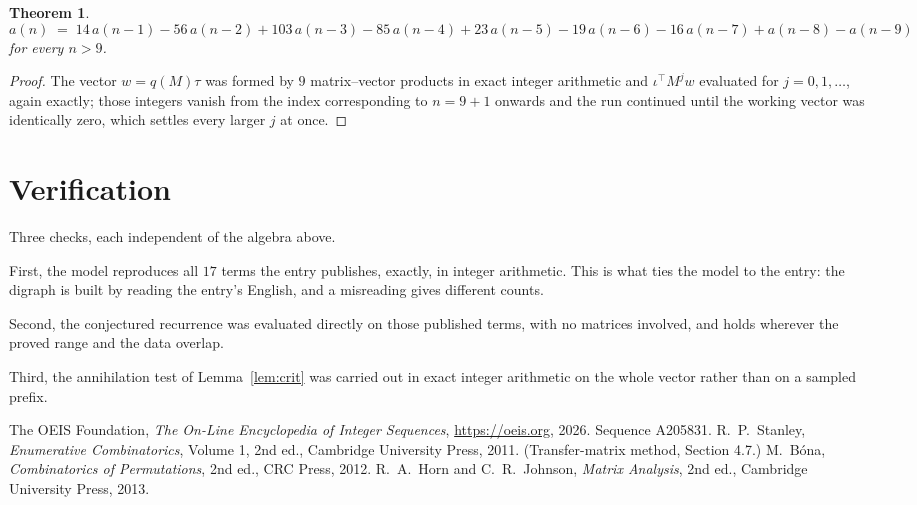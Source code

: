 \documentclass[11pt,a4paper]{article}
\theoremstyle{plain}
\newtheorem{theorem}{Theorem}
\theoremstyle{definition}
\begin{document}
\begin{theorem}
\[
a(n)\;=\;14\,a(n-1) - 56\,a(n-2) + 103\,a(n-3) - 85\,a(n-4) + 23\,a(n-5) - 19\,a(n-6) - 16\,a(n-7) + a(n-8) - a(n-9)
\]
for every $n>9$.
\end{theorem}

\begin{proof}
The vector $w=q(M)\tau$ was formed by $9$ matrix--vector products in exact integer
arithmetic and $\iota^{\!\top}M^{j}w$ evaluated for $j=0,1,\dots$, again exactly; those
integers vanish from the index corresponding to $n=9+1$ onwards and the run continued
until the working vector was identically zero, which settles every larger $j$ at once.
\end{proof}

\section{Verification}

Three checks, each independent of the algebra above.

First, the model reproduces all $17$ terms the entry publishes, exactly, in integer
arithmetic. This is what ties the model to the entry: the digraph is built by reading the
entry's English, and a misreading gives different counts.

Second, the conjectured recurrence was evaluated directly on those published terms, with no
matrices involved, and holds wherever the proved range and the data overlap.

Third, the annihilation test of Lemma~\ref{lem:crit} was carried out in exact integer
arithmetic on the whole vector rather than on a sampled prefix.

\begin{thebibliography}{9}
 The OEIS Foundation, \emph{The On-Line Encyclopedia of Integer
Sequences}, \url{https://oeis.org}, 2026. Sequence A205831.
 R.~P.~Stanley, \emph{Enumerative Combinatorics}, Volume 1, 2nd ed.,
Cambridge University Press, 2011. (Transfer-matrix method, Section 4.7.)
 M.~B\'ona, \emph{Combinatorics of Permutations}, 2nd ed., CRC
Press, 2012.
 R.~A.~Horn and C.~R.~Johnson, \emph{Matrix Analysis}, 2nd ed., Cambridge
University Press, 2013.
\end{thebibliography}
\end{document}
